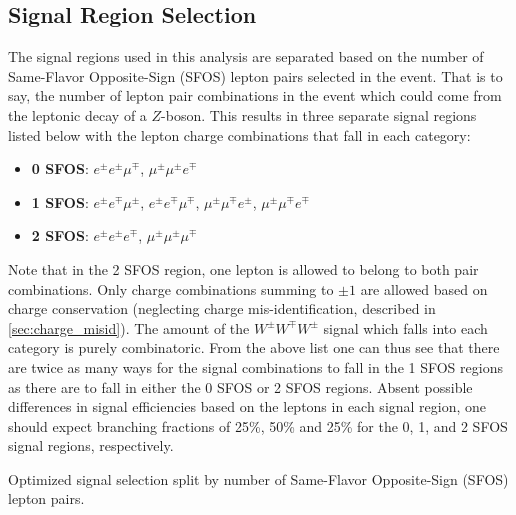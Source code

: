 \subsection{Signal Region Selection}
\label{sec:signal_regions}
The signal regions used in this analysis are separated based on the number of 
Same-Flavor Opposite-Sign (SFOS) lepton pairs selected in the event.  That is to say,
the number of lepton pair combinations in the event 
which could come from the leptonic decay of a $Z$-boson.
This results in three separate signal regions listed 
below with the lepton charge combinations
that fall in each category:
\begin{itemize}
\item \textbf{0 SFOS}: $e^{\pm}e^{\pm}\mu^{\mp}$, 
$\mu^{\pm}\mu^{\pm}e^{\mp}$ 
\item \textbf{1 SFOS}: $e^{\pm}e^{\mp}\mu^{\pm}$, 
$e^{\pm}e^{\mp}\mu^{\mp}$, $\mu^{\pm}\mu^{\mp}e^{\pm}$, $\mu^{\pm}\mu^{\mp}e^{\mp}$
\item \textbf{2 SFOS}: $e^{\pm}e^{\pm}e^{\mp}$, $\mu^{\pm}\mu^{\pm}\mu^{\mp}$
\end{itemize}
Note that in the 2 SFOS region, one lepton is allowed to belong to both 
pair combinations.
Only charge combinations summing to $\pm 1$ are allowed based on charge
conservation (neglecting charge mis-identification, described in 
\sec\ref{sec:charge_misid}).  
The amount of the $W^{\pm}W^{\mp}W^{\pm}$ signal
which falls into each category is purely combinatoric.  
From the above list one can thus see that there are twice as many ways 
for the signal combinations to fall in the 1 SFOS regions as 
there are to fall in either the 0 SFOS or 2 SFOS regions. 
Absent possible differences in signal efficiencies based on the leptons in each 
signal region, one should expect branching 
fractions of 25\%, 50\% and 25\% for the 0, 1, and 2 SFOS signal regions, respectively.


\begin{table}[ht!]
\centering
\begin{small}

\end{small}
\caption{Optimized signal selection split by number of Same-Flavor 
Opposite-Sign (SFOS) lepton pairs.}
\label{tab:signal_selection}
\end{table}

%

